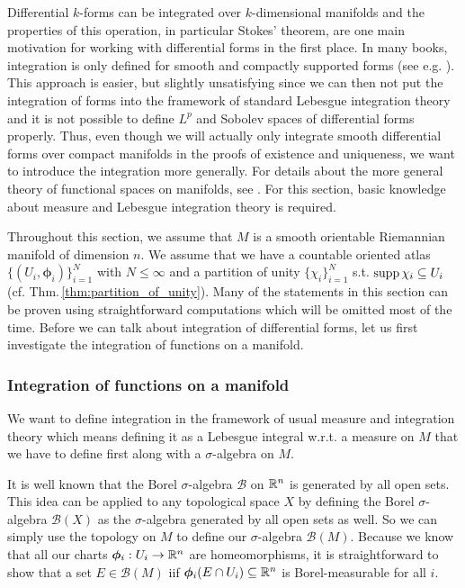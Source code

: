 \documentclass[../master_thesis.tex]{subfiles}
\begin{document}
Differential $k$-forms can be integrated over $k$-dimensional manifolds and 
the properties of this operation, in particular Stokes' theorem, are one main motivation for working with differential 
forms in the first place. In many books, integration is only defined for 
smooth and compactly supported forms (see e.g. \cite[Sec.\,V.3]{topology_and_geometry}). This approach is easier, 
but slightly unsatisfying since we can then not put the integration of forms 
into the framework of standard Lebesgue integration theory and it is not possible 
to define $L^p$ and Sobolev spaces of differential forms properly. Thus, even though we will
actually only integrate smooth differential forms over compact manifolds in the proofs
of existence and uniqueness,
we want to introduce the integration more generally. For details about the 
more general theory of functional spaces on manifolds, see \cite[Sec.\,10.2.4]{nicolaescu}.
For this section, basic knowledge about measure and Lebesgue integration theory is required. 

Throughout this section, we assume that $M$ is a smooth orientable Riemannian 
manifold of dimension $n$. We assume that we have a 
countable oriented atlas $\{ (U_i, \boldsymbol{\phi}_i) \}_{i=1}^N$ with $N \leq \infty$ 
and a partition of unity $\{\chi_i\}_{i=1}^N$ s.t. $\operatorname{supp} \chi_i \subseteq U_i$
(cf. Thm.\,\ref{thm:partition_of_unity}).
Many of the statements in this section can be proven using straightforward computations 
which will be omitted most of the time.
Before we can talk about integration of differential forms, let us first 
investigate the integration of functions on a manifold.

\subsubsection{Integration of functions on a manifold}

We want to define integration in the framework of usual measure and integration
theory which means defining it as a Lebesgue integral w.r.t. a measure on $M$
that we have to define first along with a $\sigma$-algebra on $M$. 

It is well known that
the Borel $\sigma$-algebra $\mathcal{B}$ on $\mathbb{R}^n$ is generated
by all open sets. This idea can be applied to any topological space $X$ by 
defining the Borel $\sigma$-algebra $\mathcal{B}(X)$ as the $\sigma$-algebra 
generated by all open sets as well. So we can simply use the topology on $M$ to define 
our $\sigma$-algebra $\mathcal{B}(M)$. Because we know that all our 
charts $\boldsymbol{\phi}_i: U_i \rightarrow \mathbb{R}^n$ are homeomorphisms, it is 
straightforward to show that a set $E \in \mathcal{B}(M)$ iif
$\boldsymbol{\phi}_i(E \cap U_i) \subseteq \mathbb{R}^n$ is Borel-measurable for all $i$. 
\end{document}
